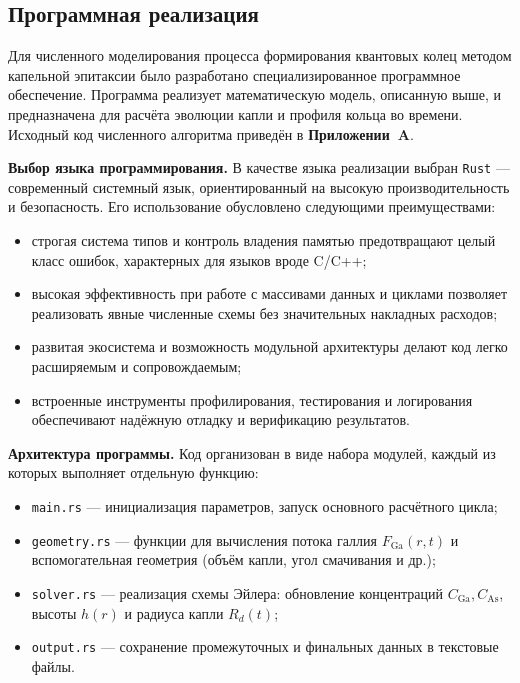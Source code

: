 \documentclass[14pt,oneside]{extarticle}
\begin{document}
\subsection{Программная реализация}

Для численного моделирования процесса формирования квантовых колец методом капельной эпитаксии было разработано специализированное программное обеспечение. Программа реализует математическую модель, описанную выше, и предназначена для расчёта эволюции капли и профиля кольца во времени. Исходный код численного алгоритма приведён в \textbf{Приложении~A}.

\textbf{Выбор языка программирования.} В качестве языка реализации выбран \texttt{Rust} — современный системный язык, ориентированный на высокую производительность и безопасность. Его использование обусловлено следующими преимуществами:

\begin{itemize}
    \item строгая система типов и контроль владения памятью предотвращают целый класс ошибок, характерных для языков вроде C/C++;
    \item высокая эффективность при работе с массивами данных и циклами позволяет реализовать явные численные схемы без значительных накладных расходов;
    \item развитая экосистема и возможность модульной архитектуры делают код легко расширяемым и сопровождаемым;
    \item встроенные инструменты профилирования, тестирования и логирования обеспечивают надёжную отладку и верификацию результатов.
\end{itemize}

\textbf{Архитектура программы.} Код организован в виде набора модулей, каждый из которых выполняет отдельную функцию:

\begin{itemize}
    \item \texttt{main.rs} — инициализация параметров, запуск основного расчётного цикла;
    \item \texttt{geometry.rs} — функции для вычисления потока галлия $F_{\mathrm{Ga}}(r, t)$ и вспомогательная геометрия (объём капли, угол смачивания и др.);
    \item \texttt{solver.rs} — реализация схемы Эйлера: обновление концентраций $C_{\mathrm{Ga}}, C_{\mathrm{As}}$, высоты $h(r)$ и радиуса капли $R_d(t)$;
    \item \texttt{output.rs} — сохранение промежуточных и финальных данных в текстовые файлы.
\end{itemize}
\end{document}
